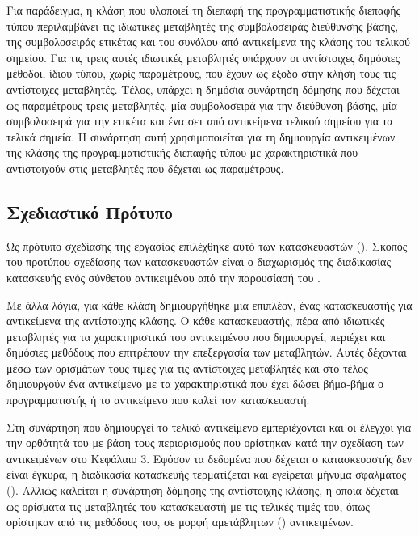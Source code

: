 Για παράδειγμα,
η κλάση που υλοποιεί τη διεπαφή της προγραμματιστικής διεπαφής τύπου 
περιλαμβάνει τις ιδιωτικές μεταβλητές της συμβολοσειράς διεύθυνσης βάσης, 
της συμβολοσειράς ετικέτας
και του συνόλου από αντικείμενα της κλάσης του τελικού σημείου.
Για τις τρεις αυτές ιδιωτικές μεταβλητές υπάρχουν οι αντίστοιχες δημόσιες μέθοδοι,
ίδιου τύπου,
χωρίς παραμέτρους,
που έχουν ως έξοδο στην κλήση τους τις αντίστοιχες μεταβλητές.
Τέλος, υπάρχει η δημόσια συνάρτηση δόμησης 
που δέχεται ως παραμέτρους τρεις μεταβλητές,
μία συμβολοσειρά για την διεύθυνση βάσης,
μία συμβολοσειρά για την ετικέτα
και ένα σετ από αντικείμενα τελικού σημείου για τα τελικά σημεία.
Η συνάρτηση αυτή χρησιμοποιείται για τη δημιουργία αντικειμένων της κλάσης της προγραμματιστικής διεπαφής τύπου 
με χαρακτηριστικά που αντιστοιχούν στις μεταβλητές που δέχεται ως παραμέτρους.

\subsection{Σχεδιαστικό Πρότυπο}
Ως πρότυπο σχεδίασης της εργασίας επιλέχθηκε αυτό των κατασκευαστών ().
Σκοπός του προτύπου σχεδίασης των κατασκευαστών είναι ο διαχωρισμός της διαδικασίας κατασκευής ενός σύνθετου αντικειμένου από την παρουσίασή του \cite{gamma1995design}.

Με άλλα λόγια,
για κάθε κλάση δημιουργήθηκε μία επιπλέον, 
ένας κατασκευαστής για αντικείμενα της αντίστοιχης κλάσης.
Ο κάθε κατασκευαστής, πέρα από ιδιωτικές μεταβλητές για τα χαρακτηριστικά του αντικειμένου που δημιουργεί,
περιέχει και δημόσιες μεθόδους που επιτρέπουν την επεξεργασία των μεταβλητών.
Αυτές δέχονται μέσω των ορισμάτων τους τιμές για τις αντίστοιχες μεταβλητές
και στο τέλος δημιουργούν ένα αντικείμενο με τα χαρακτηριστικά που έχει δώσει βήμα-βήμα ο προγραμματιστής 
ή το αντικείμενο που καλεί τον κατασκευαστή.

Στη συνάρτηση που δημιουργεί το τελικό αντικείμενο εμπεριέχονται και οι έλεγχοι
για την ορθότητά του με βάση τους περιορισμούς που ορίστηκαν κατά την σχεδίαση των αντικειμένων στο Κεφάλαιο 3.
Εφόσον τα δεδομένα που δέχεται ο κατασκευαστής δεν είναι έγκυρα,
η διαδικασία κατασκευής τερματίζεται και εγείρεται μήνυμα σφάλματος ().
Αλλιώς καλείται η συνάρτηση δόμησης της αντίστοιχης κλάσης,
η οποία δέχεται ως ορίσματα τις μεταβλητές του κατασκευαστή με τις τελικές τιμές του,
όπως ορίστηκαν από τις μεθόδους του,
σε μορφή αμετάβλητων () αντικειμένων.

